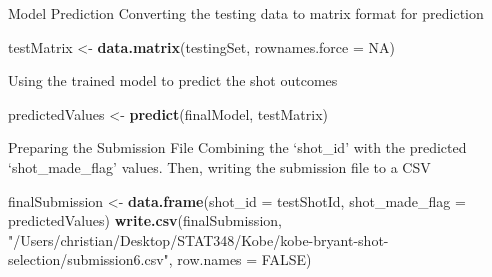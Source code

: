 \documentclass[
]{article}
\newenvironment{Shaded}{\begin{snugshade}}{\end{snugshade}}
\newcommand{\AttributeTok}[1]{\textcolor[rgb]{0.13,0.29,0.53}{#1}}
\newcommand{\ConstantTok}[1]{\textcolor[rgb]{0.56,0.35,0.01}{#1}}
\newcommand{\FunctionTok}[1]{\textcolor[rgb]{0.13,0.29,0.53}{\textbf{#1}}}
\newcommand{\NormalTok}[1]{#1}
\newcommand{\OtherTok}[1]{\textcolor[rgb]{0.56,0.35,0.01}{#1}}
\newcommand{\StringTok}[1]{\textcolor[rgb]{0.31,0.60,0.02}{#1}}
\begin{document}
Model Prediction Converting the testing data to matrix format for
prediction

\begin{Shaded}
\begin{Highlighting}[]
\NormalTok{testMatrix }\OtherTok{\textless{}{-}} \FunctionTok{data.matrix}\NormalTok{(testingSet, }\AttributeTok{rownames.force =} \ConstantTok{NA}\NormalTok{)}
\end{Highlighting}
\end{Shaded}

Using the trained model to predict the shot outcomes

\begin{Shaded}
\begin{Highlighting}[]
\NormalTok{predictedValues }\OtherTok{\textless{}{-}} \FunctionTok{predict}\NormalTok{(finalModel, testMatrix)}
\end{Highlighting}
\end{Shaded}

Preparing the Submission File Combining the `shot\_id' with the
predicted `shot\_made\_flag' values. Then, writing the submission file
to a CSV

\begin{Shaded}
\begin{Highlighting}[]
\NormalTok{finalSubmission }\OtherTok{\textless{}{-}} \FunctionTok{data.frame}\NormalTok{(}\AttributeTok{shot\_id =}\NormalTok{ testShotId, }\AttributeTok{shot\_made\_flag =}\NormalTok{ predictedValues)}
\FunctionTok{write.csv}\NormalTok{(finalSubmission, }\StringTok{"/Users/christian/Desktop/STAT348/Kobe/kobe{-}bryant{-}shot{-}selection/submission6.csv"}\NormalTok{, }\AttributeTok{row.names =} \ConstantTok{FALSE}\NormalTok{)}
\end{Highlighting}
\end{Shaded}
\end{document}
